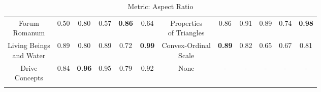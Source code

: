 \documentclass{article}
\begin{document}
{\begin{longtable}{cccccc@{\qquad}cccccc}
\makecell[c]{Forum \\ Romanum} & 0.50 & 0.80 & 0.57 & \textbf{0.86} & 0.64 & \makecell[c]{Properties \\ of Triangles} & 0.86 & 0.91 & 0.89 & 0.74 & \textbf{0.98} \\
\makecell[c]{Living Beings \\ and Water} & 0.89 & 0.80 & 0.89 & 0.72 & \textbf{0.99} & \makecell[c]{Convex-Ordinal \\ Scale} & \textbf{0.89} & 0.82 & 0.65 & 0.67 & 0.81 \\
\makecell[c]{Drive \\ Concepts} & 0.84 & \textbf{0.96} & 0.95 & 0.79 & 0.92 & None & - & - & - & - & - \\
\caption{Metric: Aspect Ratio} \\
\end{longtable}
}
\clearpage
\end{document}

